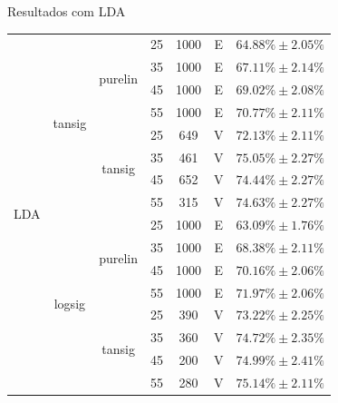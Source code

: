 \begin{frame}{Resultados com LDA}
\begin{tabularx}{\linewidth}{| c | c | c | c | c | c | c |}
                \multirow{16}{*}{LDA} & \multirow{8}{*}{tansig} & \multirow{4}{*}{purelin} & 25 & 1000 & E & $ 64.88\% \pm 2.05\%$\\
                                      &                         &                          & 35 & 1000 & E & $ 67.11\% \pm 2.14\%$\\
                                      &                         &                          & 45 & 1000 & E & $ 69.02\% \pm 2.08\%$\\
                                      &                         &                          & 55 & 1000 & E & $ 70.77\% \pm 2.11\%$\\\cline{3-7}
                                      &                         & \multirow{4}{*}{tansig}  & 25 & 649 & V & $ 72.13\% \pm 2.11\%$\\
                                      &                         &                          & 35 & 461 & V & $ 75.05\% \pm 2.27\%$\\
                                      &                         &                          & 45 & 652 & V & $ 74.44\% \pm 2.27\%$\\
                                      &                         &                          & 55 & 315 & V & $ 74.63\% \pm 2.27\%$\\\cline{2-7}
                                      & \multirow{8}{*}{logsig} & \multirow{4}{*}{purelin} & 25 & 1000 & E & $ 63.09\% \pm 1.76\%$\\
                                      &                         &                          & 35 & 1000 & E & $ 68.38\% \pm 2.11\%$\\
                                      &                         &                          & 45 & 1000 & E & $ 70.16\% \pm 2.06\%$\\
                                      &                         &                          & 55 & 1000 & E & $ 71.97\% \pm 2.06\%$\\*\cline{3-7}
                                      &                         & \multirow{4}{*}{tansig}  & 25 & 390 & V & $ 73.22\% \pm 2.25\%$\\
                                      &                         &                          & 35 & 360 & V & $ 74.72\% \pm 2.35\%$\\
                                      &                         &                          & 45 & 200 & V & $ 74.99\% \pm 2.41\%$\\
                                      &                         &                          & 55 & 280 & V & $ 75.14\% \pm 2.11\%$\\
                \bottomrule
        \end{tabularx}
\end{frame}

